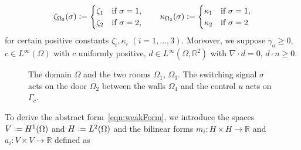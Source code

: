 \documentclass[reqno]{amsart}
\newcommand{\bx}{{\bm x}}
\newcommand{\R}{\mathbb R}
\newcommand{\inpVarDim}{\rho}
\newcommand{\switch}{\sigma}
\newcommand{\advection}{d}
\begin{document}
%
\begin{equation*}
    \zeta_{\Omega_2}(\switch)\vcentcolon=
    \begin{cases}
        \zeta_1&\text{if }\sigma=1,\\
        \zeta_2&\text{if }\sigma=2,
	\end{cases}\quad\quad\kappa_{\Omega_2}(\switch)\vcentcolon= 
    \begin{cases}
        \kappa_1&\text{if }\sigma=1,\\
        \kappa_2&\text{if }\sigma=2
	\end{cases}
\end{equation*}
%
for certain positive constants $\zeta_i, \kappa_i$ $(i=1,\ldots,3)$. Moreover, we suppose $\gamma_{\mathrm{o}}\geq 0$, $c\in L^{\infty}(\Omega)$ with $c$ uniformly positive, $\advection\in L^\infty(\Omega, \R^2)$ with $\nabla \cdot \advection = 0$, $\advection \cdot n \geq 0$. %
%
\begin{figure}
    \begin{center}
    \end{center}
    \caption[a]{The domain $\Omega$ and the two rooms $\Omega_1$, $\Omega_3$. The switching signal $\sigma$ acts on the door $\Omega_2$ between the walls $\Omega_4$ and the control $u$ acts on $\Gamma_c$.}
    \label{fig: geometry_tworooms}
\end{figure}
%
To derive the abstract form~\eqref{eqn:weakForm}, we introduce the spaces $V \vcentcolon= H^1(\Omega)$ and $H \vcentcolon=L^2(\Omega)$ and the bilinear forms $m_i\colon H\times H \to \R$ and $a_i\colon V \times V \to \R$ defined as
\end{document}

